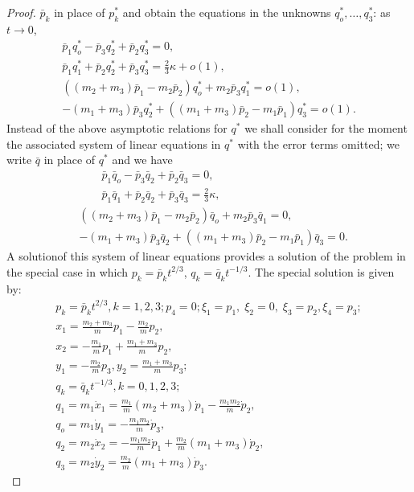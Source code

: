 \begin{proof}
$\bar{p}_k$ in place of $p^*_k$ and obtain the equations in the
unknowns $q^*_o, \ldots, q^*_3$: as $t \to 0$,  
\begin{gather*}
\bar{p}_1 q^*_o - \bar{p}_3 q^*_2 + \bar{p}_2 q^*_3 = 0, \\
\bar{p}_1 q^*_1  + \bar{p}_2 q^*_2  + \bar{p}_3 q^*_3 = \frac{2}{3} \kappa + o(1),\\
((m_2 + m_3) \bar{p}_1 - m_2 \bar{p}_2 ) q^*_o + m_2 \bar{p}_3 q^*_1 = o(1),\\
-(m_1 + m_3) \bar{p}_3 q^*_2 + ((m_1 + m_3) \bar{p}_2 - m_1 \bar{p}_1) q^*_3 = o(1).
\end{gather*}
Instead of the above asymptotic relations for $q^*$ we shall consider
for the moment the associated system of linear equations in $q^*$ with
the error terms omitted; we write $\bar{q}$ in place of $q^*$ and we
have  
\begin{align*}
&  \qquad \bar{p}_1 \bar{q}_o - \bar{p}_3 \bar{q}_2 + \bar{p}_2
  \bar{q}_3 = 0,\\ 
& \qquad \bar{p}_1 \bar{q}_1 + \bar{p}_2 \bar{q}_2 + \bar{p}_3
  \bar{q}_3 = \frac{2}{3} \kappa, \\ 
& ((m_2 + m_3) \bar{p}_1 - m_2 \bar{p}_2) \bar{q}_o + m_2 \bar{p}_3
  \bar{q}_1 = 0,\\  
& - (m_1 + m_3) \bar{p}_3 \bar{q}_2 + ((m_1 + m_3) \bar{p}_2 - m_1
  \bar{p}_1 ) \bar{q}_3 = 0. \tag{3.4.25}\label{chap3:eq3.4.25} 
\end{align*}
A solution\pageoriginale of this system of linear equations provides a
solution of the problem in the special case in which $p_k = \bar{p}_k
t^{2/3}$, $q_k = \bar{q}_k t^{-1/3}$. The special solution is given
by: 
\begin{gather*}
p_k = \bar{p}_k t^{2/3}, k = 1,2,3; p_4 = 0; \xi_1 = p_1 , \; \xi_2 =
0, \; \xi_3 = p_2, \xi_4 = p_3; \\ 
x_1 = \frac{m_2 + m_3}{m} p_1 - \frac{m_2}{m} p_2, \\ 
x_2 = - \frac{m_1}{m} p_1 + \frac{m_1 + m_3}{m} p_2, \\ 
y_1 = - \frac{m_2}{m} p_3, y_2 = \frac{m_1 + m_3}{m} p_3;\\
q_k =\bar{q}_k  t^{-1/3}, k = 0, 1,2,3;\\
q_1 = m_1 \dot{x}_1 = \frac{m_1}{m} (m_2 + m_3) \dot{p}_1 -
\frac{m_1m_2}{m} \dot{p}_2,\\  
q_o = m_1 \dot{y}_1 = - \frac{m_1 m_2}{m} \dot{p}_3, \\
q_2  = m_2 \dot{x}_2 = - \frac{m_1 m_2}{m} \dot{p}_1 + \frac{m_2}{m}
(m_1+ m_3) \dot{p}_2,\\  
q_3 = m_2 \dot{y}_2 = \frac{m_2}{m} (m_1 + m_3) \dot{p}_3. 
\end{gather*}


\end{proof}
